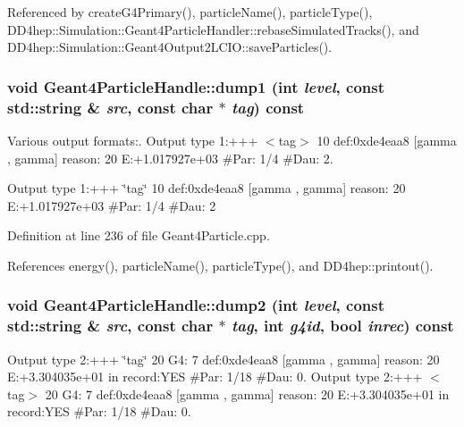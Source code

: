 Referenced by createG4Primary(), particleName(), particleType(), DD4hep::Simulation::Geant4ParticleHandler::rebaseSimulatedTracks(), and DD4hep::Simulation::Geant4Output2LCIO::saveParticles().\hypertarget{class_d_d4hep_1_1_simulation_1_1_geant4_particle_handle_a2183fca2acd9c08d09c39f405c54c031}{
\subsubsection[{dump1}]{\setlength{\rightskip}{0pt plus 5cm}void Geant4ParticleHandle::dump1 (int {\em level}, \/  const std::string \& {\em src}, \/  const char $\ast$ {\em tag}) const}}
\label{class_d_d4hep_1_1_simulation_1_1_geant4_particle_handle_a2183fca2acd9c08d09c39f405c54c031}


Various output formats:. Output type 1:+++ $<$tag$>$ 10 def:0xde4eaa8 \mbox{[}gamma , gamma\mbox{]} reason: 20 E:+1.017927e+03 \#Par: 1/4 \#Dau: 2.

Output type 1:+++ \char`\"{}tag\char`\"{} 10 def:0xde4eaa8 \mbox{[}gamma , gamma\mbox{]} reason: 20 E:+1.017927e+03 \#Par: 1/4 \#Dau: 2 

Definition at line 236 of file Geant4Particle.cpp.

References energy(), particleName(), particleType(), and DD4hep::printout().\hypertarget{class_d_d4hep_1_1_simulation_1_1_geant4_particle_handle_ae83f08e6b7a7e69e9aca2487c445aadb}{
\subsubsection[{dump2}]{\setlength{\rightskip}{0pt plus 5cm}void Geant4ParticleHandle::dump2 (int {\em level}, \/  const std::string \& {\em src}, \/  const char $\ast$ {\em tag}, \/  int {\em g4id}, \/  bool {\em inrec}) const}}
\label{class_d_d4hep_1_1_simulation_1_1_geant4_particle_handle_ae83f08e6b7a7e69e9aca2487c445aadb}


Output type 2:+++ \char`\"{}tag\char`\"{} 20 G4: 7 def:0xde4eaa8 \mbox{[}gamma , gamma\mbox{]} reason: 20 E:+3.304035e+01 in record:YES \#Par: 1/18 \#Dau: 0. Output type 2:+++ $<$tag$>$ 20 G4: 7 def:0xde4eaa8 \mbox{[}gamma , gamma\mbox{]} reason: 20 E:+3.304035e+01 in record:YES \#Par: 1/18 \#Dau: 0. 


